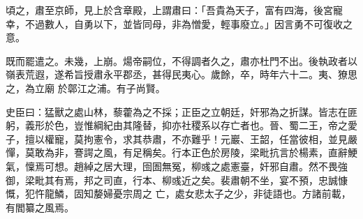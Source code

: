 \begin{pinyinscope}
 頃之，肅至京師，見上於含章殿，上謂肅曰：「吾貴為天子，富有四海，後宮寵幸，不過數人，自勇以下，並皆同母，非為憎愛，輕事廢立。」因言勇不可復收之意。



 既而罷遣之。未幾，上崩。煬帝嗣位，不得調者久之，肅亦杜門不出。後執政者以嶺表荒遐，遂希旨授肅永平郡丞，甚得民夷心。歲餘，卒，時年六十二。夷、獠思之，為立廟
 於鄣江之浦。有子尚賢。



 史臣曰：猛獸之處山林，藜藿為之不採；正臣之立朝廷，奸邪為之折謀。皆志在匪躬，義形於色，豈惟綱紀由其隆替，抑亦社稷系以存亡者也。晉、蜀二王，帝之愛子，擅以權寵，莫拘憲令，求其恭肅，不亦難乎！元巖、王韶，任當彼相，並見嚴憚，莫敢為非，謇諤之風，有足稱矣。行本正色於房陵，梁毗抗言於楊素，直辭鯁氣，懍焉可想。趙綽之居大理，囹圄無冤，柳彧之處憲臺，奸邪自肅。然不畏強御，梁毗其有焉，邦之司直，行本、柳彧近之矣。裴肅朝不坐，宴不預，忠誠慷慨，犯忤龍鱗，固知嫠婦憂宗周之
 亡，處女悲太子之少，非徒語也。方諸前載，有閻纂之風焉。



\end{pinyinscope}